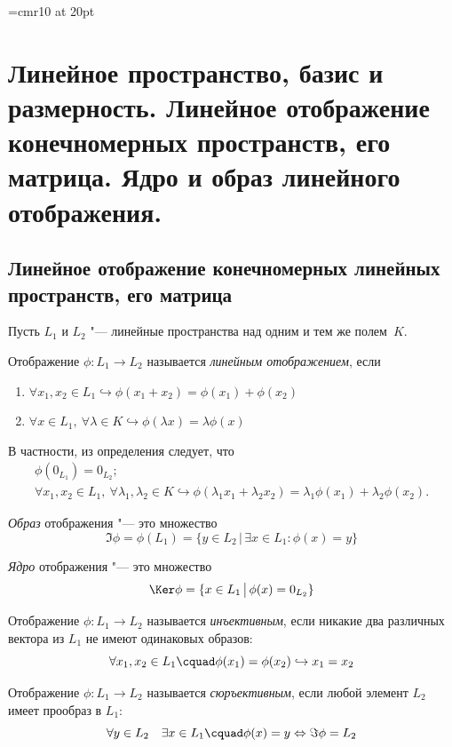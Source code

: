 \font\Large=cmr10 at 20pt
\def\fudge#1{\smash{\hbox{\Large#1}}}
\chapter{Линейное пространство, базис и размерность. Линейное отображение конечномерных
пространств, его матрица. Ядро и образ линейного отображения.}

\section{Линейное отображение конечномерных линейных пространств, его матрица}
Пусть $L_1$ и $L_2$ "--- линейные пространства над одним  и тем же полем~$K$.
\begin{defn}
Отображение $\phi\colon L_1\rightarrow L_2$ называется \textit{линейным отображением}, если
\begin{enumerate}
\item $\forall x_1,x_2 \in L_1 \hookrightarrow \phi(x_1+x_2)=\phi(x_1)+\phi(x_2)$
\item $\forall x \in L_1,\ \forall \lambda \in K \hookrightarrow \phi(\lambda x)=\lambda \phi(x)$
\end{enumerate}
\end{defn}
В частности, из определения следует, что
\begin{gather}\label{ch22:eq:eq1}
\phi(0_{L_1}) =0_{L_2};\\
\forall x_1,x_2\in L_1,\ \forall\lambda_1,\lambda_2\in K \hookrightarrow \phi(\lambda_1 x_1 + \lambda_2 x_2) = \lambda_1 \phi(x_1) + \lambda_2 \phi(x_2).
\end{gather}
\begin{defn}
\textit{Образ} отображения "--- это множество 
\begin{equation}
\Im\phi=\phi(L_1)=\{y\in L_2\,\big|\, \exists x\in L_1: \phi(x)=y\}
\end{equation}
\end{defn}
\begin{defn}
\textit{Ядро} отображения "--- это множество 
\begin{equation}
\Ker\phi=\{x\in L_1\,\big|\, \phi(x)=0_{L_2}\}
\end{equation}
\end{defn}
\begin{defn}
Отображение $\phi\colon L_1\rightarrow L_2$ называется \textit{инъективным}, если никакие два различных вектора из $L_1$ не имеют одинаковых образов:
\begin{equation}\label{22.1.inject}
\forall x_1,x_2 \in L_1\cquad \phi(x_1)=\phi(x_2) \hookrightarrow x_1=x_2
\end{equation}
\end{defn}  
\begin{defn}
Отображение $\phi\colon L_1\rightarrow L_2$ называется \textit{сюръективным}, если любой элемент $L_2$ имеет прообраз в $L_1$:
\begin{equation}\label{22.1.surject}
\forall y \in L_2 \quad \exists x \in L_1\cquad \phi(x)=y \Leftrightarrow \Im \phi = L_2
\end{equation}
\end{defn}  

